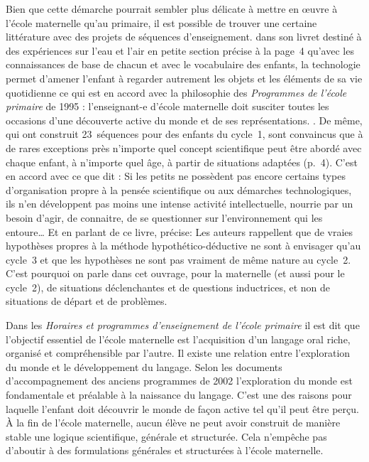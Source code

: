 Bien que cette démarche pourrait sembler plus délicate à mettre en œuvre à l’école maternelle qu’au primaire, il est possible de trouver une certaine littérature avec des projets de séquences d’enseignement.  dans son livret destiné à des expériences sur l’eau et l’air en petite section précise à la page~4 qu’\og avec les connaissances de base de chacun et avec le vocabulaire des enfants, la technologie permet d’amener l’enfant à regarder autrement les objets et les éléments de sa vie quotidienne \fg{} ce qui est en accord avec la philosophie des \emph{Programmes de l’école primaire} de 1995 : \og l’enseignant-e d’école maternelle doit susciter toutes les occasions d’une découverte active du monde et de ses représentations. \fg{} \cite[p.~3]{Sacy2000}. De même,  qui ont construit 23~séquences pour des enfants du cycle~1, sont convaincus que \og à de rares exceptions près n’importe quel concept scientifique peut être abordé avec chaque enfant, à n’importe quel âge, à partir de situations adaptées \fg{} (p.~4). C’est en accord avec ce que dit  :
Si les petits ne possèdent pas encore certains types d’organisation propre à la pensée scientifique ou aux démarches technologiques, ils n’en développent pas moins une intense activité intellectuelle, nourrie par un besoin d’agir, de connaitre, de se questionner sur l’environnement qui les entoure\dots{}
Et en parlant de ce livre,  précise:
Les auteurs rappellent que de vraies hypothèses propres à la méthode hypothético-déductive ne sont à envisager qu’au cycle~3 et que les \og hypothèses\fg{} ne sont pas vraiment de même nature au cycle~2. C’est pourquoi on parle dans cet ouvrage, pour la maternelle (et aussi pour le cycle~2), de situations déclenchantes et de questions inductrices, et non de situations de départ et de problèmes.

Dans les \textit{Horaires et programmes d’enseignement de l’école primaire} \cite{BO2008} il est dit que l’objectif essentiel de l’école maternelle est l’acquisition d’un
langage oral riche, organisé et compréhensible par l’autre. Il existe une relation entre l’exploration du monde et le développement du langage. Selon les documents d’accompagnement des anciens programmes de 2002 \cite{Adam2005} l’exploration du monde est fondamentale et préalable à la naissance du langage. C’est une des raisons pour laquelle l’enfant doit découvrir le monde de façon active tel qu’il peut être perçu. À la fin de l’école maternelle, aucun élève ne peut avoir construit de manière stable une logique scientifique, générale et structurée. Cela n’empêche pas d’aboutir à des formulations générales et structurées à l’école maternelle.

